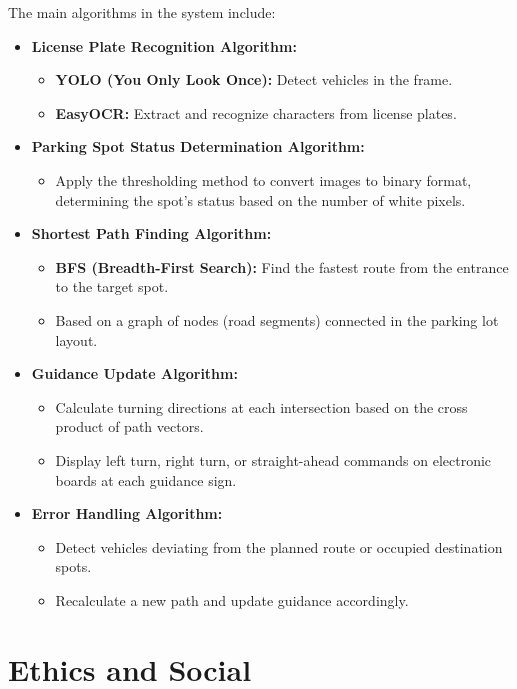 \documentclass{article}
\begin{document}
\begin{itemize}[label=-]
The main algorithms in the system include:
\begin{itemize}[label=-]
    \item \textbf{License Plate Recognition Algorithm:}
    \begin{itemize}
        \item \textbf{YOLO (You Only Look Once):} Detect vehicles in the frame.
        \item \textbf{EasyOCR:} Extract and recognize characters from license plates.
    \end{itemize}
    \item \textbf{Parking Spot Status Determination Algorithm:}
    \begin{itemize}
        \item Apply the thresholding method to convert images to binary format, determining the spot's status based on the number of white pixels.
    \end{itemize}
    \item \textbf{Shortest Path Finding Algorithm:}
    \begin{itemize}
        \item \textbf{BFS (Breadth-First Search):} Find the fastest route from the entrance to the target spot.
        \item Based on a graph of nodes (road segments) connected in the parking lot layout.
    \end{itemize}
    \item \textbf{Guidance Update Algorithm:}
    \begin{itemize}
        \item Calculate turning directions at each intersection based on the cross product of path vectors.
        \item Display left turn, right turn, or straight-ahead commands on electronic boards at each guidance sign.
    \end{itemize}
    \item \textbf{Error Handling Algorithm:}
    \begin{itemize}
        \item Detect vehicles deviating from the planned route or occupied destination spots.
        \item Recalculate a new path and update guidance accordingly.
    \end{itemize}
\end{itemize}

\section{Ethics and Social}


\end{itemize}
\end{document}
